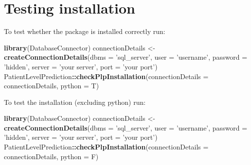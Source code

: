 \documentclass[]{article}
\newenvironment{Shaded}{\begin{snugshade}}{\end{snugshade}}
\newcommand{\KeywordTok}[1]{\textcolor[rgb]{0.13,0.29,0.53}{\textbf{#1}}}
\newcommand{\DataTypeTok}[1]{\textcolor[rgb]{0.13,0.29,0.53}{#1}}
\newcommand{\StringTok}[1]{\textcolor[rgb]{0.31,0.60,0.02}{#1}}
\newcommand{\OperatorTok}[1]{\textcolor[rgb]{0.81,0.36,0.00}{\textbf{#1}}}
\newcommand{\NormalTok}[1]{#1}
\begin{document}
\section{Testing installation}\label{testing-installation}

To test whether the package is installed correctly run:

\begin{Shaded}
\begin{Highlighting}[]
\KeywordTok{library}\NormalTok{(DatabaseConnector)}
\NormalTok{connectionDetails <-}\StringTok{ }\KeywordTok{createConnectionDetails}\NormalTok{(}\DataTypeTok{dbms =} \StringTok{'sql_server'}\NormalTok{, }
                                             \DataTypeTok{user =} \StringTok{'username'}\NormalTok{, }
                                             \DataTypeTok{password =} \StringTok{'hidden'}\NormalTok{, }
                                             \DataTypeTok{server =} \StringTok{'your server'}\NormalTok{, }
                                             \DataTypeTok{port =} \StringTok{'your port'}\NormalTok{)}
\NormalTok{PatientLevelPrediction}\OperatorTok{::}\KeywordTok{checkPlpInstallation}\NormalTok{(}\DataTypeTok{connectionDetails =}\NormalTok{ connectionDetails, }
                                             \DataTypeTok{python =}\NormalTok{ T)}
\end{Highlighting}
\end{Shaded}

To test the installation (excluding python) run:

\begin{Shaded}
\begin{Highlighting}[]
\KeywordTok{library}\NormalTok{(DatabaseConnector)}
\NormalTok{connectionDetails <-}\StringTok{ }\KeywordTok{createConnectionDetails}\NormalTok{(}\DataTypeTok{dbms =} \StringTok{'sql_server'}\NormalTok{, }
                                           \DataTypeTok{user =} \StringTok{'username'}\NormalTok{, }
                                           \DataTypeTok{password =} \StringTok{'hidden'}\NormalTok{, }
                                           \DataTypeTok{server =} \StringTok{'your server'}\NormalTok{, }
                                           \DataTypeTok{port =} \StringTok{'your port'}\NormalTok{)}
\NormalTok{PatientLevelPrediction}\OperatorTok{::}\KeywordTok{checkPlpInstallation}\NormalTok{(}\DataTypeTok{connectionDetails =}\NormalTok{ connectionDetails, }
                                             \DataTypeTok{python =}\NormalTok{ F)}
\end{Highlighting}
\end{Shaded}
\end{document}
